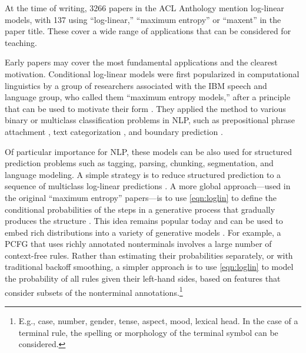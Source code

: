 \documentclass[11pt,letterpaper]{article}
\begin{document}
At the time of writing, 3266 papers in the ACL Anthology mention
log-linear models, with 137 using ``log-linear,'' ``maximum entropy''
or ``maxent'' in the paper title.  These cover a wide range of
applications that can be considered for teaching.

Early papers may cover the most fundamental applications and the
clearest motivation.  Conditional log-linear models were first
popularized in computational linguistics by a group of researchers
associated with the IBM speech and language group, who called them
``maximum entropy models,'' after a principle that can be used to
motivate their form \cite{jaynes-1957}.  They applied the method to
various binary or multiclass classification problems in NLP, such as
prepositional phrase attachment \cite{ratnaparkhi-1994}, text
categorization \cite{nigam-lafferty-mccallum-1999}, and boundary
prediction \cite{beeferman-berger-lafferty-1999}.

Of particular importance for NLP, these models can be also used for
structured prediction problems such as tagging, parsing, chunking,
segmentation, and language modeling.  A simple strategy is to reduce
structured prediction to a sequence of multiclass log-linear
predictions \cite{ratnaparkhi-1998}.  A more global approach---used in
the original ``maximum entropy'' papers---is to use \eqref{eqn:loglin}
to define the conditional probabilities of the steps in a generative
process that gradually produces the structure
\cite{rosenfeld-1994,berger-dellapietra-dellapietra-1996}.  This idea
remains popular today and can be used to embed rich distributions
into a variety of generative models \cite{bergkirkpatrick-et-al-2010}.
For example, a PCFG that uses richly annotated nonterminals involves a
large number of context-free rules.  Rather than estimating their
probabilities separately, or with traditional backoff smoothing, a
simpler approach is to use \eqref{eqn:loglin} to model the probability
of all rules given their left-hand sides, based on features that
consider subsets of the nonterminal annotations.\footnote{E.g., case,
  number, gender, tense, aspect, mood, lexical head.  In the case of a
  terminal rule, the spelling or morphology of the terminal symbol can
  be considered.}  
\end{document}
